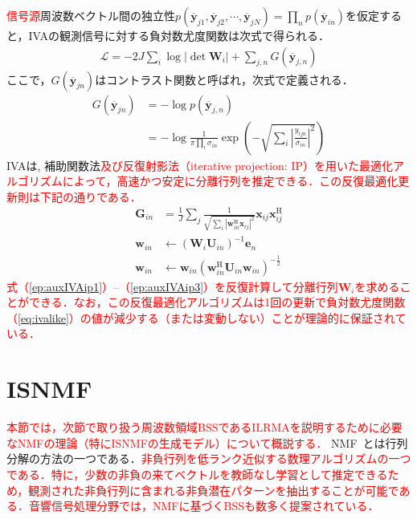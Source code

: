 \textcolor{red}{信号源}周波数ベクトル間の独立性$p(\overline{\bm{y}}_{j1}, \overline{\bm{y}}_{j2}, \cdots, \overline{\bm{y}}_{jN}) = \prod_n p(\overline{\bm{y}}_{in})$を仮定すると，IVAの観測信号に対する負対数尤度関数は次式で得られる．
\begin{align}
    \mathcal{L} = -2J \sum_i \log |\det \bm{W}_i| + \sum_{j,n} G(\overline{\bm{y}}_{j,n})
    \label{eq:ivalike}
\end{align}
ここで，$G(\overline{\bm{y}}_{jn})$はコントラスト関数と呼ばれ，次式で定義される．
\begin{align}
  \nonumber G(\overline{\bm{y}}_{jn}) &= -\log p(\overline{\bm{y}}_{j,n}) \\
  &= -\log \frac{1}{\pi \prod_{i} \sigma_{in}} \exp \left(  - \sqrt{ \sum_i \left| \frac{y_{ijn}}{\sigma_{in}} \right|^2}  \right)
\end{align}
IVAは, 補助関数法\cite{auxfunc}\textcolor{red}{及び反復射影法（iterative projection: IP）\cite{auxIVA}を用いた最適化アルゴリズムによって，高速かつ安定に分離行列を推定できる\cite{stable_auxIVA}．この反復最適化更新則は下記の通りである．}
\begin{align}
\bm{G}_{in} &= \frac{1}{J} \sum_j \frac{1}{\sqrt{\sum_{i} |\bm{w}_{in}^\mathrm{H}\bm{x}_{ij}|^{2}}} \bm{x}_{ij} \bm{x}_{ij}^{\mathrm{H}} \label{ep:auxIVAip1} \\
\bm{w}_{in} &\leftarrow (\bm{W}_i \bm{U}_{in})^{-1} \bm{e}_n \label{ep:auxIVAip2} \\
\bm{w}_{in} &\leftarrow \bm{w}_{in} ( \bm{w}_{in}^{\mathrm{H}} \bm{U}_{in} \bm{w}_{in} )^{-\frac{1}{2}} \label{ep:auxIVAip3}
\end{align}
\textcolor{red}{式（\ref{ep:auxIVAip1}）--（\ref{ep:auxIVAip3}）を反復計算して分離行列$\bm{W}_i$を求めることができる．なお，この反復最適化アルゴリズムは1回の更新で負対数尤度関数（\ref{eq:ivalike}）の値が減少する（または変動しない）ことが理論的に保証されている．}


\section{ISNMF}
\label{sec:conv:isnmf}

\textcolor{red}{本節では，次節で取り扱う周波数領域BSSであるILRMAを説明するために必要なNMFの理論（特にISNMFの生成モデル）について概説する．}
NMF~\cite{NMF}とは行列分解の方法の一つである．\textcolor{red}{非負行列を低ランク近似する数理アルゴリズムの一つである．特に，少数の非負の来てベクトルを教師なし学習として推定できるため，観測された非負行列に含まれる非負潜在パターンを抽出することが可能である．音響信号処理分野では，NMFに基づくBSSも数多く提案されている\cite{singlechsep, supNMF, MNMF_oz}．}

